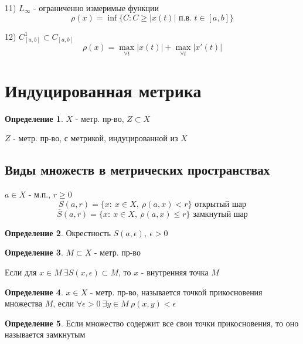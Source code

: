 \documentclass[a4paper]{article}
\theoremstyle{definition}
\newtheorem*{definition}{Определение}
\theoremstyle{remark}
\begin{document}
11) $ L_{\infty} $ - ограниченно измеримые функции 
\[
    \rho(x) = \inf \{C: C \geq |x(t)| \text{ п.в. } t \in [a,b]\}
\]

12) $ C^1_{[a,b]} \subset C_{[a,b]} $ 
\[
    \rho(x) = \max_{\forall t}|x(t)| + \max_{\forall t}|x'(t)|
\]

\section*{\centering Индуцированная метрика}
\begin{tcolorbox}
\begin{definition}
    $ X $ - метр. пр-во, $ Z \subset X $ 

    $ Z $ - метр. пр-во, с метрикой, индуцированной из $ X $ 
\end{definition}
\end{tcolorbox}

\subsection*{Виды множеств в метрических пространствах}
$ a \in X $ - м.п., $ r \geq 0 $ 
\[
    S(a,r) = \{ x: \ x \in X, \ \rho(a,x) < r \} \text{ открытый шар}
\]
\[
    \overline{S}(a,r) = \{ x: \ x \in X, \ \rho(a,x) \leq r \} \text{ замкнутый шар}
\]

\begin{tcolorbox}
    \begin{definition}
        Окрестность $ S(a,\epsilon), \ \epsilon > 0 $ 
    \end{definition}
\end{tcolorbox}

\begin{tcolorbox}
\begin{definition}
    $ M \subset X $ - метр. пр-во

    Если для $ x \in M \ \exists S(x,\epsilon) \subset M $, то $ x $ - внутренняя
    точка $ M $ 
\end{definition}
\end{tcolorbox}

\begin{tcolorbox}
\begin{definition}
    $ x \in X $ - метр. пр-во, называется точкой прикосновения множества $ M $,
    если $ \forall \epsilon > 0 \ \exists y \in M \ \rho(x,y) < \epsilon $ 
\end{definition}
\end{tcolorbox}

\begin{tcolorbox}
\begin{definition}
    Если множество содержит все свои точки прикосновения, то оно называется 
    замкнутым
\end{definition}
\end{tcolorbox}
\end{document}

